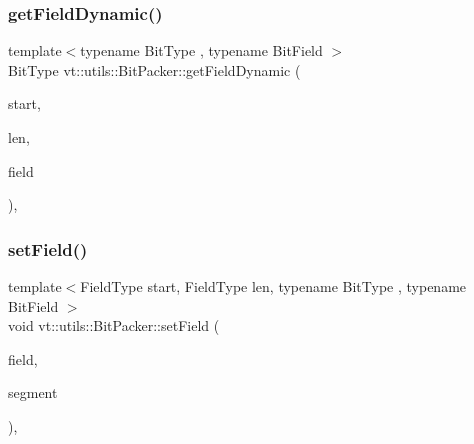\subsubsection{\texorpdfstring{get\+Field\+Dynamic()}{getFieldDynamic()}}
{\footnotesize\ttfamily template$<$typename Bit\+Type , typename Bit\+Field $>$ \\
Bit\+Type vt\+::utils\+::\+Bit\+Packer\+::get\+Field\+Dynamic (\begin{DoxyParamCaption}\item[{\hyperlink{structvt_1_1utils_1_1_bit_packer_a23024285425933c1f10c8fc3942f9beb}{Field\+Type}}]{start,  }\item[{\hyperlink{structvt_1_1utils_1_1_bit_packer_a23024285425933c1f10c8fc3942f9beb}{Field\+Type}}]{len,  }\item[{Bit\+Field const \&}]{field }\end{DoxyParamCaption})\hspace{0.3cm}{\ttfamily [inline]}, {\ttfamily [static]}}

\mbox{\label{structvt_1_1utils_1_1_bit_packer_a4bffe5bd05d11955016e5f8f9161893b}} 
\subsubsection{\texorpdfstring{set\+Field()}{setField()}}
{\footnotesize\ttfamily template$<$Field\+Type start, Field\+Type len, typename Bit\+Type , typename Bit\+Field $>$ \\
void vt\+::utils\+::\+Bit\+Packer\+::set\+Field (\begin{DoxyParamCaption}\item[{Bit\+Field \&}]{field,  }\item[{Bit\+Type const \&}]{segment }\end{DoxyParamCaption})\hspace{0.3cm}{\ttfamily [inline]}, {\ttfamily [static]}}

\mbox{\label{structvt_1_1utils_1_1_bit_packer_a9d000b5dcc34456e43cbff50fafa3fb9}} 
